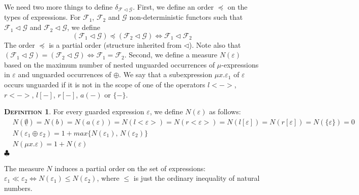 \documentclass{LMCS}
\newcommand\E\varepsilon
\newcommand\G{\mathcal{G}}
\newcommand\F{\mathcal{F}}
\newcommand\emp{\underline\emptyset}
\theoremstyle{definition}
\newtheorem{mydefinition}{\textsc{Definition}}[section]
\theoremstyle{plain}
\theoremstyle{plain}
\theoremstyle{plain}
\theoremstyle{plain}
\theoremstyle{definition}
\theoremstyle{definition}
\newenvironment{definition}{
\begin{mydefinition}}
    {\hfill$\clubsuit$\end{mydefinition}}
\begin{document}
We need two more things to define $\delta_{\F \lhd \G}$. First, we define an order $\preceq$ on the types of expressions. 
For $\F_1$, $\F_2$ and $\G$ non-deterministic functors such that
$\F_1\lhd \G$ and $\F_2\lhd \G$, we define $$(\F_1\lhd \G) \preceq
(\F_2\lhd \G) \Leftrightarrow \F_1\lhd \F_2$$
The order $\preceq$ is a partial order (structure inherited from
$\lhd$). Note also that  $(\F_1\lhd \G) = (\F_2\lhd \G) \Leftrightarrow \F_1=\F_2$. Second, we define a measure $N(\E)$ based on the maximum number of nested unguarded occurrences of $\mu$-expressions in $\E$ and unguarded occurrences of $\oplus$.  We say that a subexpression $\mu x.\E_1$ of $\E$  occurs unguarded if it is not in the scope of one of the operators $l<->$, $r<->$, $l[-]$, $r[-]$, $a(-)$ or $\{-\}$. 
\begin{definition}\label{def:N} For every guarded expression $\E$, we define $N(\E)$ as follows:
\begin{align*}
&N(\emp) = N(b) = N(a(\E)) = N(l<\E>) = N(r<\E>) = N(l[\E]) =
N(r[\E]) = N(\{\E\})= 0
\\
&N(\E_1 \oplus \E_2) = 1 + \mathit{max} \{ N(\E_1) , \, N(\E_2) \}\\
& N(\mu x.\E) = 1 + N(\E)
\end{align*}
\end{definition}
\noindent The measure $N$ induces a partial order on the set of expressions: $\E_1\ll \E_2 \Leftrightarrow N(\E_1) \leq N(\E_2)$, where $\leq$ is just the ordinary inequality of natural numbers. 
\end{document}
